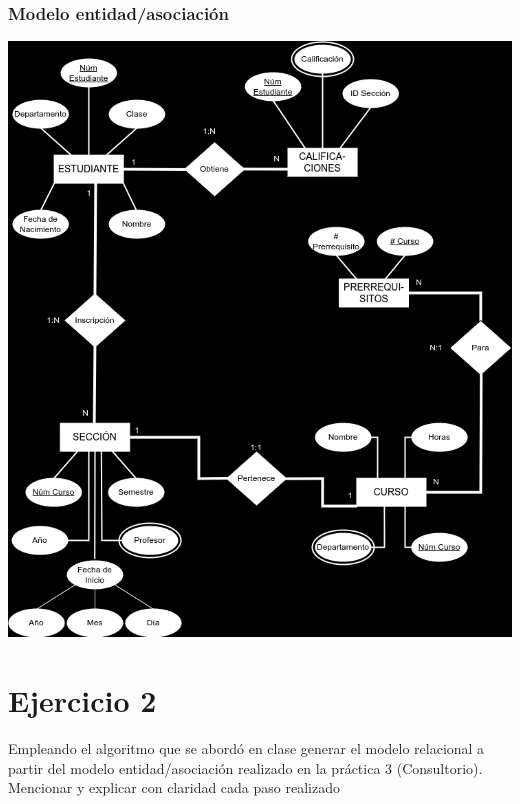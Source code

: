 \documentclass[a4paper,12pt]{article}
\begin{document}
\subsubsection*{Modelo entidad/asociación}
\begin{center}
    \includegraphics[scale = .5]{IMA/Ejercio1.png}    
\end{center}
\thispagestyle{fancy} %
\newpage
\section*{Ejercicio 2}
\textcolor{sun}{Empleando el algoritmo que se abordó en clase generar el modelo
relacional a partir del modelo entidad/asociación realizado en la práctica 3 (Consultorio). Mencionar y explicar con claridad cada paso realizado}
\thispagestyle{fancy} %
\end{document}
